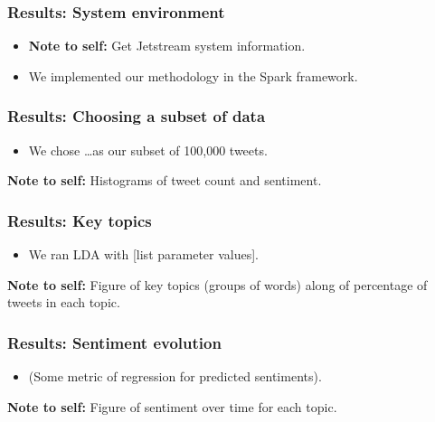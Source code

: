 \documentclass{beamer}
\begin{document}
\begin{frame}
\frametitle{Results: System environment}
\begin{itemize}
\item \textbf{Note to self: } Get Jetstream system information.
\item We implemented our methodology in the Spark framework.
\end{itemize}
\end{frame}

\begin{frame}
\frametitle{Results: Choosing a subset of data}
\begin{itemize}
\item We chose \ldots as our subset of 100,000 tweets.
\end{itemize}
\begin{center}
\textbf{Note to self: } Histograms of tweet count and sentiment.
\end{center}
\end{frame}

\begin{frame}
\frametitle{Results: Key topics}
\begin{itemize}
\item We ran LDA with [list parameter values].
\end{itemize}
\begin{center}
\textbf{Note to self: } Figure of key topics (groups of words) along of percentage of tweets in each topic.
\end{center}
\end{frame}

\begin{frame}
\frametitle{Results: Sentiment evolution}
\begin{itemize}
\item (Some metric of regression for predicted sentiments).
\end{itemize}
\begin{center}
\textbf{Note to self: } Figure of sentiment over time for each topic.
\end{center}
\end{frame}
\end{document}
